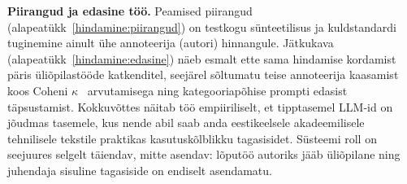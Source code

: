\textbf{Piirangud ja edasine töö.} Peamised piirangud (alapeatükk~\ref{hindamine:piirangud}) on testkogu sünteetilisus ja kuldstandardi tuginemine ainult ühe annoteerija (autori) hinnangule. Jätkukava (alapeatükk~\ref{hindamine:edasine}) näeb esmalt ette sama hindamise kordamist päris üliõpilastööde katkenditel, seejärel sõltumatu teise annoteerija kaasamist koos Coheni $\kappa$~\cite{cohen_kappa_1960} arvutamisega ning kategooriapõhise prompti edasist täpsustamist. Kokkuvõttes näitab töö empiiriliselt, et tipptasemel LLM-id on jõudmas tasemele, kus nende abil saab anda eestikeelsele akadeemilisele tehnilisele tekstile praktikas kasutuskõlblikku tagasisidet. Süsteemi roll on seejuures selgelt täiendav, mitte asendav: lõputöö autoriks jääb üliõpilane ning juhendaja sisuline tagasiside on endiselt asendamatu.
